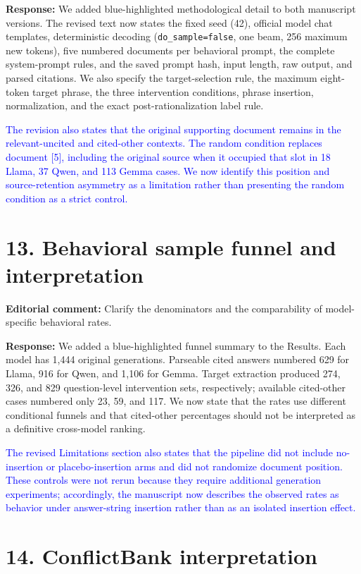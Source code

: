 \documentclass[11pt]{article}
\begin{document}
\textbf{Response:} We added blue-highlighted methodological detail to both manuscript versions. The revised text now states the fixed seed (42), official model chat templates, deterministic decoding (\texttt{do\_sample=false}, one beam, 256 maximum new tokens), five numbered documents per behavioral prompt, the complete system-prompt rules, and the saved prompt hash, input length, raw output, and parsed citations. We also specify the target-selection rule, the maximum eight-token target phrase, the three intervention conditions, phrase insertion, normalization, and the exact post-rationalization label rule.

\textcolor{blue}{The revision also states that the original supporting document remains in the relevant-uncited and cited-other contexts. The random condition replaces document [5], including the original source when it occupied that slot in 18 Llama, 37 Qwen, and 113 Gemma cases. We now identify this position and source-retention asymmetry as a limitation rather than presenting the random condition as a strict control.}

\section*{13. Behavioral sample funnel and interpretation}

\textbf{Editorial comment:} Clarify the denominators and the comparability of model-specific behavioral rates.

\textbf{Response:} We added a blue-highlighted funnel summary to the Results. Each model has 1,444 original generations. Parseable cited answers numbered 629 for Llama, 916 for Qwen, and 1,106 for Gemma. Target extraction produced 274, 326, and 829 question-level intervention sets, respectively; available cited-other cases numbered only 23, 59, and 117. We now state that the rates use different conditional funnels and that cited-other percentages should not be interpreted as a definitive cross-model ranking.

\textcolor{blue}{The revised Limitations section also states that the pipeline did not include no-insertion or placebo-insertion arms and did not randomize document position. These controls were not rerun because they require additional generation experiments; accordingly, the manuscript now describes the observed rates as behavior under answer-string insertion rather than as an isolated insertion effect.}

\section*{14. ConflictBank interpretation}
\end{document}
